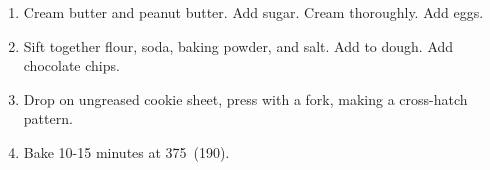 
\begin{ingredients}
\end{ingredients}


\begin{recipe}
  \begin{enumerate}
  \item Cream butter and peanut butter.  Add sugar.  Cream thoroughly.
    Add eggs.

  \item Sift together flour, soda, baking powder, and salt.  Add to
    dough.  Add chocolate chips.

  \item Drop on ungreased cookie sheet, press with a fork, making a
    cross-hatch pattern.

  \item Bake 10-15 minutes at 375\F\ (190\C).

  \end{enumerate}
\end{recipe}
